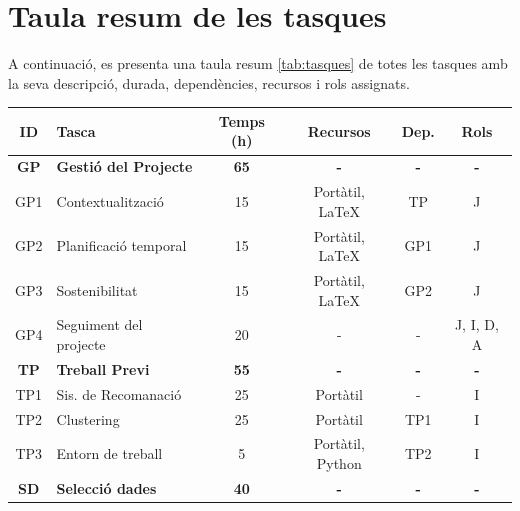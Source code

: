 \documentclass[a4paper,12pt]{report}
\begin{document}
\section{Taula resum de les tasques}

A continuació, es presenta una taula resum \ref{tab:tasques} de totes les tasques amb la seva descripció, durada, dependències, recursos i rols assignats.

\begin{table}[H]
    \centering
    \small
    \begin{tabular}{|c|p{4cm}|c|c|c|c|}
    \hline
    \textbf{ID} & \textbf{Tasca}                                     & \textbf{Temps (h)} & \textbf{Recursos} & \textbf{Dep.} & \textbf{Rols} \\ \hline
    \textbf{GP}          & \textbf{Gestió del Projecte}                                & \textbf{65}                 & \textbf{-}                 & \textbf{-}                     & \textbf{-}             \\ \hline
    GP1         & Contextualització            & 15                 & Portàtil, LaTeX   & TP                   & J             \\
    GP2         & Planificació temporal                              & 15                 & Portàtil, LaTeX   & GP1                   & J             \\
    GP3         & Sostenibilitat                  & 15                 & Portàtil, LaTeX   & GP2                   & J             \\
    GP4         & Seguiment del projecte                             & 20                 & -                 & -                     & J, I, D, A    \\ \hline
    \textbf{TP}          & \textbf{Treball Previ}                                      & \textbf{55}                 & \textbf{-}                 & \textbf{-}                     & \textbf{-}             \\ \hline
    TP1         & Sis. de Recomanació               & 25                 & Portàtil          & -                     & I             \\
    TP2         & Clustering & 25                 & Portàtil          & TP1                   & I             \\
    TP3         & Entorn de treball                  & 5                  & Portàtil, Python  & TP2                   & I             \\ \hline
    \textbf{SD}          & \textbf{Selecció dades}         & \textbf{40}                 & \textbf{-}                 & \textbf{-}                     & \textbf{-}             \\ \hline

\end{tabular}
\end{table}
\end{document}
